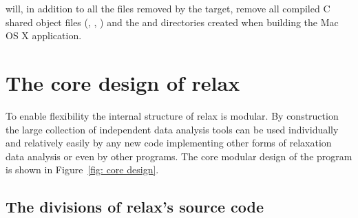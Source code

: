 will, in addition to all the files removed by the  target, remove all compiled C shared object files (, , ) and the  and  directories created when building the Mac OS X application.




\section{The core design of relax}

To enable flexibility the internal structure of relax is modular.
By construction the large collection of independent data analysis tools can be used individually and relatively easily by any new code implementing other forms of relaxation data analysis or even by other programs.
The core modular design of the program is shown in Figure~\ref{fig: core design}.



\subsection{The divisions of relax's source code}

